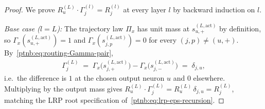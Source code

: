 \begin{proof}
We prove $R_u^{(L)} \cdot \Gamma^{(l)}_j = R^{(l)}_j$ at every layer $l$ by backward induction on
$l$.

\emph{Base case ($l = L$):} The trajectory law $\Pi_x$ has unit mass at
$s_{u,+}^{(L,\mathrm{act})}$ by definition, so $\Gamma_x(s_{u,+}^{(L,\mathrm{act})}) = 1$ and
$\Gamma_x(s_{j,p}^{(L,\mathrm{act})}) = 0$ for every $(j,p) \neq (u,+)$.
By~\eqref{ptnb:eq:routing-Gamma-pair},
\begin{align}
    \Gamma^{(L)}_j \;=\; \Gamma_x\!\bigl(s_{j,+}^{(L,\mathrm{act})}\bigr) -
    \Gamma_x\!\bigl(s_{j,-}^{(L,\mathrm{act})}\bigr) \;=\; \delta_{j,u},
\end{align}
i.e.\ the difference is $1$ at the chosen output neuron $u$ and $0$ elsewhere. Multiplying by the
output mass gives $R_u^{(L)} \cdot \Gamma^{(L)}_j = R_u^{(L)}\,\delta_{j,u} = R^{(L)}_j$, matching
the LRP root specification of~\eqref{ptnb:eq:lrp-eps-recursion}.


\end{proof}
